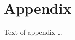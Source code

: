 \documentclass[sigplan,review,anonymous=false]{acmart}\settopmatter{printfolios=true,printccs=false,printacmref=false}
\begin{document}





\appendix
\section{Appendix}

Text of appendix \ldots
\end{document}
